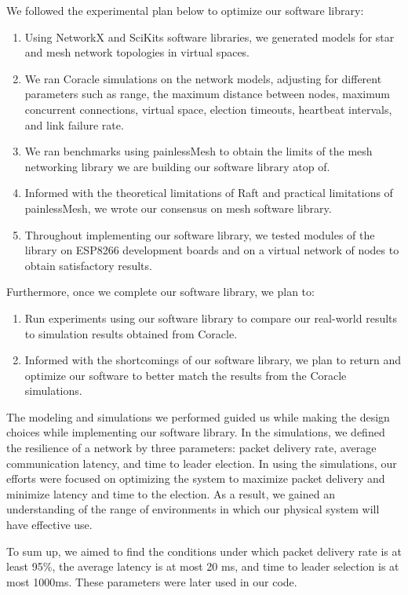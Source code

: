 We followed the  experimental plan below to optimize our software library:
\begin{enumerate}
    \item Using NetworkX and SciKits software libraries, we generated models for star and mesh network topologies in virtual spaces.
    \item We ran Coracle simulations on the network models, adjusting for different parameters such as range, the maximum distance between nodes, maximum concurrent connections, virtual space, election timeouts, heartbeat intervals, and link failure rate.
    \item We ran benchmarks using painlessMesh to obtain the limits of the mesh networking library we are building our software library atop of. 
    \item Informed with the theoretical limitations of Raft and practical limitations of painlessMesh, we wrote our consensus on mesh software library.  
    \item Throughout implementing our software library, we tested modules of the library on ESP8266 development boards and on a virtual network of nodes to obtain satisfactory results.
\end{enumerate}

Furthermore, once we complete our software library, we plan to: 
\begin{enumerate}
    \item Run experiments using our software library to compare our real-world results to simulation results obtained from Coracle.
    \item Informed with the shortcomings of our software library, we plan to return and optimize our software to better match the results from the Coracle simulations.
\end{enumerate}


The modeling and simulations we performed guided us while making the design choices while implementing our software library. In the simulations, we defined the resilience of a network by three parameters: packet delivery rate, average communication latency, and time to leader election. In using the simulations, our efforts were focused on optimizing the system to maximize packet delivery and minimize latency and time to the election. As a result, we gained an understanding of the range of environments in which our physical system will have effective use.

To sum up, we aimed to find the conditions under which packet delivery rate is at least 95\%, the average latency is at most 20 ms, and time to leader selection is at most 1000ms. These parameters were later used in our code.
